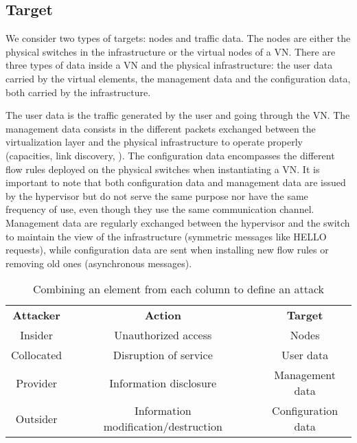 \subsection{Target}
We consider two types of targets: nodes and traffic data.
The nodes are either the physical switches in the infrastructure or the virtual nodes of a VN.
There are three types of data inside a VN and the physical infrastructure:
the user data carried by the virtual elements, the management data and the configuration data, both carried by the infrastructure. 

The user data is the traffic generated by the user and going through the VN.
The management data consists in the different packets exchanged between the virtualization layer and the physical infrastructure to operate properly (capacities, link discovery, \etc).
The configuration data encompasses the different flow rules deployed on the physical switches when instantiating a VN.
It is important to note that both configuration data and management data are issued by the hypervisor but do not serve the same purpose nor have the same frequency of use, even though they use the same communication channel.
Management data are regularly exchanged between the hypervisor and the switch to maintain the view of the infrastructure (\eg symmetric messages like HELLO requests), while configuration data are sent when installing new flow rules or removing old ones (\eg asynchronous messages).

\begin{table}[ht]
\centering
\begin{tabular}{|c|c|c|c|c|}
\cline{1-1} \cline{3-3} \cline{5-5}
\textbf{Attacker} &  & \textbf{Action}                      &  & \textbf{Target}    \\ \cline{1-1} \cline{3-3} \cline{5-5} 
Insider           &  & Unauthorized access                  &  & Nodes              \\ \cline{1-1} \cline{3-3} \cline{5-5} 
Collocated        &  & Disruption of service                &  & User data          \\ \cline{1-1} \cline{3-3} \cline{5-5} 
Provider          &  & Information disclosure               &  & Management data    \\ \cline{1-1} \cline{3-3} \cline{5-5} 
Outsider          &  & Information modification/destruction &  & Configuration data \\ \cline{1-1} \cline{3-3} \cline{5-5} 
\end{tabular}%
\caption{Combining an element from each column to define an attack}
\label{tab:attack-model}
\end{table}

